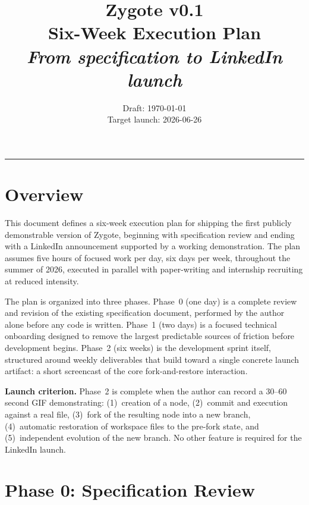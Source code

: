\documentclass[11pt,letterpaper]{article}
\title{
  \vspace{-0.5in}
  {\Huge\bfseries Zygote v0.1}\\[0.3em]
  {\Large\color{soft} Six-Week Execution Plan}\\[1em]
  {\normalsize\color{soft}\itshape From specification to LinkedIn launch}
}
\author{}
\date{
  \normalsize Draft: \today\\
  \footnotesize Target launch: 2026-06-26
}
\begin{document}
\maketitle
\thispagestyle{fancy}

\vspace{-3em}
\begin{center}
\rule{0.5\textwidth}{0.4pt}
\end{center}

\section{Overview}

This document defines a six-week execution plan for shipping the first publicly demonstrable version of Zygote, beginning with specification review and ending with a LinkedIn announcement supported by a working demonstration. The plan assumes five hours of focused work per day, six days per week, throughout the summer of 2026, executed in parallel with paper-writing and internship recruiting at reduced intensity.

The plan is organized into three phases. Phase~0 (one day) is a complete review and revision of the existing specification document, performed by the author alone before any code is written. Phase~1 (two days) is a focused technical onboarding designed to remove the largest predictable sources of friction before development begins. Phase~2 (six weeks) is the development sprint itself, structured around weekly deliverables that build toward a single concrete launch artifact: a short screencast of the core fork-and-restore interaction.

\begin{notebox}
\textbf{Launch criterion.} Phase~2 is complete when the author can record a 30--60 second GIF demonstrating: (1)~creation of a node, (2)~commit and execution against a real file, (3)~fork of the resulting node into a new branch, (4)~automatic restoration of workspace files to the pre-fork state, and (5)~independent evolution of the new branch. No other feature is required for the LinkedIn launch.
\end{notebox}

\section{Phase 0: Specification Review}
\label{sec:phase0}
\end{document}
